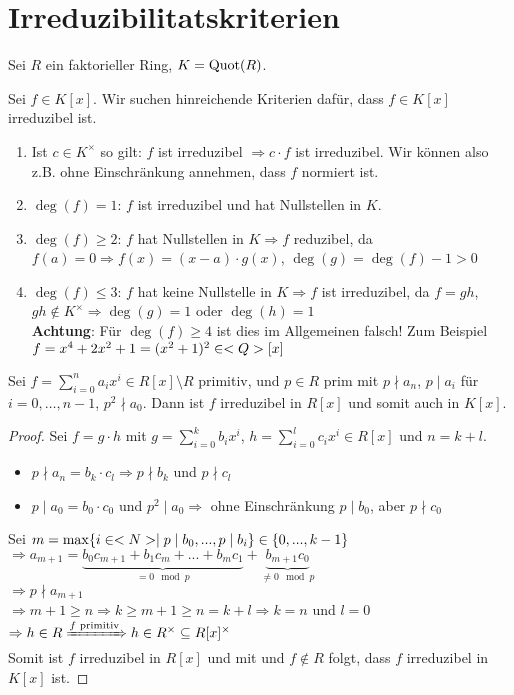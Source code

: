 \section{Irreduzibilitatskriterien}

Sei $R$ ein faktorieller Ring, $K = \operatorname{Quot}(R)$.

\begin{remark}
	Sei $f \in K[x]$. Wir suchen hinreichende Kriterien dafür, dass $f \in K[x]$ irreduzibel ist.
	\begin{enumerate}[label=(\alph*)]
		\item Ist $c \in K^{\times}$ so gilt: $f$ ist irreduzibel $\Longrightarrow c \cdot f$ ist irreduzibel. Wir können also z.B. ohne Einschränkung annehmen, dass $f$ normiert ist.
		\item $\deg(f) = 1$: $f$ ist irreduzibel und hat Nullstellen in $K$.
		\item $\deg(f) \ge 2$: $f$ hat Nullstellen in $K \Rightarrow f$ reduzibel, da $f(a) = 0 \Rightarrow f(x) = (x-a)\cdot g(x)$, $\deg(g) = \deg(f) - 1 > 0$
		\item $\deg(f) \le 3$: $f$ hat keine Nullstelle in $K \Rightarrow f$ ist irreduzibel, da $f=gh$, $gh \not \in K^{\times}\Rightarrow \deg(g) = 1$ oder $\deg(h) = 1$\\
		\textbf{Achtung}: Für $\deg(f) \ge 4$ ist dies im Allgemeinen falsch! Zum Beispiel $f = x^4 + 2x^2 + 1 = (x^2 +1)^2 \in <Q>[x]$
	\end{enumerate}
\end{remark}

\begin{proposition}
	Sei $f = \sum_{i=0}^{n} a_i x^i \in R[x]\setminus R$ primitiv, und $p \in R$ prim mit $p\nmid a_n$, $p \mid a_i$ für $i = 0, \dots,n-1$, $p^2 \nmid a_0$. Dann ist $f$ irreduzibel in $R[x]$ und somit auch in $K[x]$.
\end{proposition}

\begin{proof}
	Sei $f=g\cdot h$ mit $g=\sum_{i=0}^k b_ix^i$, $h=\sum_{i=0}^l c_ix^i\in R[x]$ und $n=k+l$.
	\begin{itemize}
		\item $p\nmid a_n = b_k\cdot c_l\Rightarrow p\nmid b_k$ und $p\nmid c_l$
		\item $p\mid a_0 = b_0\cdot c_0$ und $p^2\mid a_0\Rightarrow$ ohne Einschränkung $p\mid b_0$, aber $p\nmid c_0$
	\end{itemize}
	Sei $m=\max\{i\in<N>\mid p\mid b_0,...,p\mid b_i\}\in \{0,...,k-1\}$ \\
	$\Rightarrow a_{m+1} = \underbrace{b_0c_{m+1}+b_1c_m+...+b_mc_1}_{=0\mod p} + \underbrace{b_{m+1}c_0}_{\neq 0\mod p}$ \\
	$\Rightarrow p\nmid a_{m+1}$ \\
	$\Rightarrow m+1\ge n\Rightarrow k\ge m+1\ge n = k+l\Rightarrow k=n$ und $l=0$ \\
	$\Rightarrow h\in R\xRightarrow{f\text{ primitiv}} h\in R^\times \subseteq R[x]^\times$ \\
	Somit ist $f$ irreduzibel in $R[x]$ und mit  und $f\notin R$ folgt, dass $f$ irreduzibel in $K[x]$ ist.
\end{proof}

